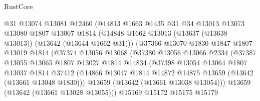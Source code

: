 \begin{lexlean}{RustCore}
\begin{coremodule}
                          @31
                          @13074
                          @13081
                          @12460
                          (@14813
                            @1663
                            @1435
                            @31
                            @34
                            @13013
                            @13073
                            @13080
                            @1807
                            @13007
                            @1814
                            (@14848
                              @1662
                              @13013
                              (@13637 (@13638 @13013))
                              (@13642 (@13644 @1662 @31)))
                            (@37366
                              @13070
                              @1830
                              @1847
                              @1807
                              @13019
                              @1814
                              (@37374
                                @13056
                                @13068
                                (@37380
                                  @13056
                                  @13066
                                  @2334
                                  (@37387
                                    @13055
                                    @13065
                                    @1807
                                    @13027
                                    @1814
                                    @14834
                                    (@37398
                                      @13054
                                      @13064
                                      @1807
                                      @13037
                                      @1814
                                      @37412
                                      (@14866
                                        @13047
                                        @1814
                                        @14872
                                        @14875
                                        @13659
                                        (@13642 (@13661 @13048 @1830)))
                                      @13659
                                      (@13642 (@13661 @13038 @13054)))
                                    @13659
                                    (@13642 (@13661 @13028 @13055)))
                                  @15169
                                  @15172
                                  @15175
                                  @15179

\end{coremodule}
\end{lexlean}

